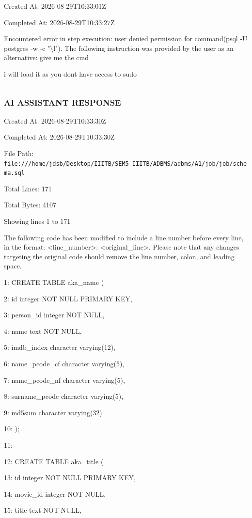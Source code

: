 \documentclass[11pt,a4paper]{article}
\begin{document}
Created At: 2026-08-29T10:33:01Z

Completed At: 2026-08-29T10:33:27Z


Encountered error in step execution: user denied permission for command(psql -U postgres -w -c "\textbackslash{}l"). The following instruction was provided by the user as an alternative: give me the cmd

i will load it as you dont have access to sudo


\hrule

\subsubsection{AI ASSISTANT RESPONSE}

Created At: 2026-08-29T10:33:30Z

Completed At: 2026-08-29T10:33:30Z

File Path: \texttt{file:///home/jdsb/Desktop/IIITB/SEM5\_IIITB/ADBMS/adbms/A1/job/job/schema.sql}

Total Lines: 171

Total Bytes: 4107

Showing lines 1 to 171

The following code has been modified to include a line number before every line, in the format: <line\_number>: <original\_line>. Please note that any changes targeting the original code should remove the line number, colon, and leading space.

1: CREATE TABLE aka\_name (

2:     id integer NOT NULL PRIMARY KEY,

3:     person\_id integer NOT NULL,

4:     name text NOT NULL,

5:     imdb\_index character varying(12),

6:     name\_pcode\_cf character varying(5),

7:     name\_pcode\_nf character varying(5),

8:     surname\_pcode character varying(5),

9:     md5sum character varying(32)

10: );

11:

12: CREATE TABLE aka\_title (

13:     id integer NOT NULL PRIMARY KEY,

14:     movie\_id integer NOT NULL,

15:     title text NOT NULL,
\end{document}
